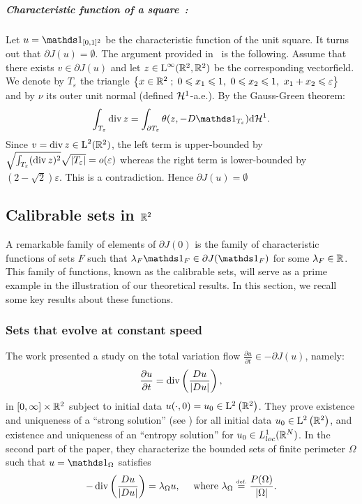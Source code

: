 \subparagraph{Characteristic function of a square~:} Let $u= \bun{[0,1]^2}$ be the characteristic function of the unit square. It turns out that $\partial J(u)= \emptyset$. 
The argument provided in~\cite{Meyer} is the following. Assume that there exists $v\in \partial J(u)$ and let $z\in \text{\upshape L}^\infty(\mathbb{R}^2,\mathbb{R}^2)$ be the corresponding vectorfield. We denote by $T_{\varepsilon}$ the triangle $\left\{ x\in \mathbb{R}^2 \;;\; 0\leqslant x_1\leqslant 1,\ 0\leqslant x_2\leqslant 1,\ x_1+x_2\leqslant \varepsilon \right\}$ and by $\nu$ its outer unit normal (defined $\mathcal{H}^1$-a.e.). By the Gauss-Green theorem:
\begin{equation*}
  \int_{T_\varepsilon} \divx z  = \int_{\partial T_\varepsilon} \theta(z,-D\bun{T_\varepsilon})\diff \Hh^1.
\end{equation*}
Since $v=\operatorname{div} z\in\text{\upshape L}^2(\mathbb{R}^2)$, the left term is upper-bounded by $\sqrt{\int_{T_\varepsilon} ({\operatorname{div} z})^2}\sqrt{\left| T_\varepsilon \right|}=o\mathopen{}\left(\varepsilon\right)$ whereas the right term is lower-bounded by $(2-\sqrt{2})\varepsilon$. This is a contradiction. Hence $\partial J(u)= \emptyset$


\subsection{Calibrable sets in $\mathbb{R}^2$}
\label{sec-calibrable}


A remarkable family of elements of $\partial J(0)$ is the family of characteristic functions of sets $F$ such that $\la_F\bun{F}\in \partial J(\bun{F})$ for some $\lambda_F\in \mathbb{R}$. This family of functions, known as the calibrable sets, will serve as a prime example in the illustration of our theoretical results.   In this section, we recall some key results about these functions.

\subsubsection{Sets that evolve at constant speed}
The work \cite{beltvflow02} presented a study on the total variation flow $\frac{\partial u}{\partial t}\in -\partial J(u)$, namely:
\begin{align}
  \frac{\partial u}{\partial t}= \operatorname{div} \left(\frac{Du}{|Du|} \right),
  \label{eq-tvflow}
\end{align}
in $[0,\infty]\times \mathbb{R}^2$ subject to initial data $u(\cdot,0) = u_0\in \mathrm{L}^2\left(\mathbb{R}^2\right)$.
They prove existence and uniqueness of a ``strong solution'' (see \cite{beltvflow02}) for all initial data $u_0\in \mathrm{L}^2\left(\mathbb{R}^2\right)$, and existence and uniqueness of an ``entropy solution'' for $u_0\in L^1_{loc}(\mathbb{R}^N)$.
In the second part of the paper, they characterize the bounded sets of finite perimeter $\Omega$ such that $u=\bun{\Omega}$ satisfies
\begin{align}
  -\operatorname{div} \left(\frac{Du}{|Du|}\right)= \lambda_\Omega u, \quad \mbox{ where } \lambda_\Omega\stackrel{\mbox{\upshape\tiny def.}}{=} \frac{P(\Omega)}{|\Omega|}.
\end{align}

